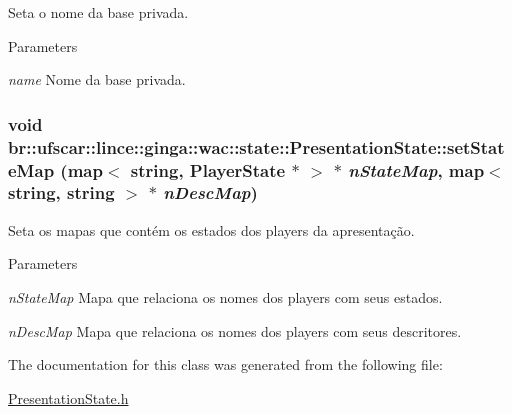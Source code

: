 Seta o nome da base privada. 
\begin{DoxyParams}{Parameters}
\item[{\em name}]Nome da base privada. \end{DoxyParams}
\hypertarget{classbr_1_1ufscar_1_1lince_1_1ginga_1_1wac_1_1state_1_1PresentationState_aa288af47b8342244e574e36a3564a933}{
\subsubsection[{setStateMap}]{\setlength{\rightskip}{0pt plus 5cm}void br::ufscar::lince::ginga::wac::state::PresentationState::setStateMap (map$<$ string, PlayerState $\ast$ $>$ $\ast$ {\em nStateMap}, \/  map$<$ string, string $>$ $\ast$ {\em nDescMap})}}
\label{classbr_1_1ufscar_1_1lince_1_1ginga_1_1wac_1_1state_1_1PresentationState_aa288af47b8342244e574e36a3564a933}


Seta os mapas que contém os estados dos players da apresentação. 
\begin{DoxyParams}{Parameters}
\item[{\em nStateMap}]Mapa que relaciona os nomes dos players com seus estados. \item[{\em nDescMap}]Mapa que relaciona os nomes dos players com seus descritores. \end{DoxyParams}


The documentation for this class was generated from the following file:\begin{DoxyCompactItemize}
\item 
\hyperlink{PresentationState_8h}{PresentationState.h}\end{DoxyCompactItemize}
